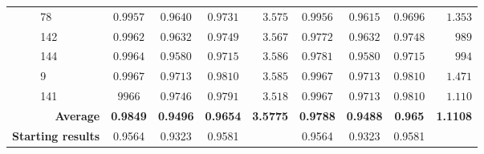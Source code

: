 \begin{table}
\begin{tabular}{ll|cccr|cccr}
        & 78 & $0.9957$ & $0.9640$ & $0.9731$ & $3.575$ & $0.9956$ & $0.9615$ & $0.9696$ & $1.353$\\
        & 142 & $0.9962$ & $0.9632$ & $0.9749$ & $3.567$ & $0.9772$ & $0.9632$ & $0.9748$ & $989$\\
        & 144 & $0.9964$ & $0.9580$ & $0.9715$ & $3.586$ & $0.9781$ & $0.9580$ & $0.9715$ & $994$\\
        & 9 & $0.9967$ & $0.9713$ & $0.9810$ & $3.585$ & $0.9967$ & $0.9713$ & $0.9810$ & $1.471$\\
        & 141 & $9966$ & $0.9746$ & $0.9791$ & $3.518$ & $0.9967$ & $0.9713$ & $0.9810$ & $1.110$\\
        \cmidrule{1-10}
        \multicolumn{2}{r|}{\textbf{Average}} & \textbf{0.9849} & \textbf{0.9496} & \textbf{0.9654} & \textbf{3.5775} & \textbf{0.9788} & \textbf{0.9488} & \textbf{0.965} & \textbf{1.1108}\\
        \cmidrule{1-10}
        \multicolumn{2}{r|}{\textbf{Starting results}} & 0.9564 & 0.9323 & 0.9581 & & 0.9564 & 0.9323 & 0.9581 & \\
        \bottomrule
    \end{tabular}
    \normalsize
\end{table}
\renewcommand{\arraystretch}{1}

